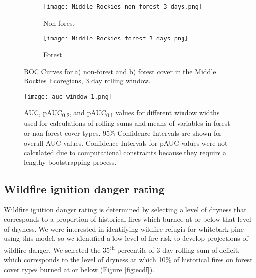 \documentclass[11p]{article}
\newcommand{\pauc}[1]{pAUC\textsubscript{#1}}
\begin{document}
\begin{figure}[htbp]
  \centering
  \begin{subfigure}{.5\textwidth}
    \centering
    \texttt{[image: Middle Rockies-non\_forest-3-days.png]}
    \caption{Non-forest}
    \label{fig:mr-nf-auc}
  \end{subfigure}%
  \begin{subfigure}{.5\textwidth}
    \centering
    \texttt{[image: Middle Rockies-forest-3-days.png]}
    \caption{Forest}
    \label{fig:mr-f-auc}
  \end{subfigure}
  \caption{ROC Curves for a) non-forest and b) forest cover in the Middle Rockies Ecoregions, 3 day rolling window.}
  \label{fig:auc}
\end{figure}

\begin{figure}[htbp]
  \centering
  \texttt{[image: auc-window-1.png]}
  \caption{AUC, \pauc{0.2}, and \pauc{0.1} values for different window widths used for calculations of rolling sums and means of variables in forest or non-forest cover types. 95\% Confidence Intervals are shown for overall AUC values. Confidence Intervals for pAUC values were not calculated due to computational constraints because they require a lengthy bootstrapping process.}
  \label{fig:auc_window}
\end{figure}

\subsection{Wildfire ignition danger rating}

Wildfire ignition danger rating is determined by selecting a level of dryness that corresponds to a proportion of historical fires which burned at or below that level of dryness. We were interested in identifying wildfire refugia for whitebark pine using this model, so we identified a low level of fire risk to develop projections of wildfire danger. We selected the 35\textsuperscript{th} percentile of 3-day rolling sum of deficit, which corresponds to the level of dryness at which 10\% of historical fires on forest cover types burned at or below (Figure \ref{fig:ecdf}).
\end{document}
